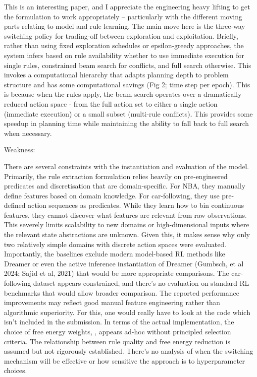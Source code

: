 This is an interesting paper, and I appreciate the engineering heavy lifting to get the formulation to work appropriately – particularly with the different moving parts relating to model and rule learning. The main move here is the three-way switching policy for trading-off between exploration and exploitation. Briefly, rather than using fixed exploration schedules or epsilon-greedy approaches, the system infers based on rule availability whether to use immediate execution for single rules, constrained beam search for conflicts, and full search otherwise. This invokes a computational hierarchy that adapts planning depth to problem structure and has some computational savings (Fig 2; time step per epoch). This is because when the rules apply, the beam search operates over a dramatically reduced action space - from the full action set to either a single action (immediate execution) or a small subset (multi-rule conflicts). This provides some speedup in planning time while maintaining the ability to fall back to full search when necessary.

Weakness:

There are several constraints with the instantiation and evaluation of the model. Primarily, the rule extraction formulation relies heavily on pre-engineered predicates and discretisation that are domain-specific. For NBA, they manually define features based on domain knowledge. For car-following, they use pre-defined action sequences as predicates. While they learn how to bin continuous features, they cannot discover what features are relevant from raw observations. This severely limits scalability to new domains or high-dimensional inputs where the relevant state abstractions are unknown. Given this, it makes sense why only two relatively simple domains with discrete action spaces were evaluated. Importantly, the baselines exclude modern model-based RL methods like Dreamer or even the active inference instantiation of Dreamer (Gumbsch, et al 2024; Sajid et al, 2021) that would be more appropriate comparisons. The car-following dataset appears constrained, and there's no evaluation on standard RL benchmarks that would allow broader comparison. The reported performance improvements may reflect good manual feature engineering rather than algorithmic superiority. For this, one would really have to look at the code which isn’t included in the submission. In terms of the actual implementation, the choice of free energy weights, 
, appears ad-hoc without principled selection criteria. The relationship between rule quality and free energy reduction is assumed but not rigorously established. There's no analysis of when the switching mechanism will be effective or how sensitive the approach is to hyperparameter choices.

